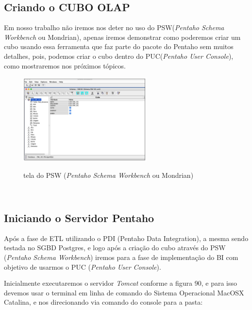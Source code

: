 \subsection{Criando o CUBO OLAP}

Em nosso trabalho n\~{a}o iremos nos deter no uso do PSW(\textit{Pentaho Schema Workbench} ou Mondrian), apenas iremos demonstrar como poderemos criar um cubo usando essa ferramenta que faz parte do pacote do Pentaho sem muitos detalhes, pois, podemos criar o cubo dentro do PUC(\textit{Pentaho User Console}), como mostraremos nos pr\'oximos t\'opicos.

\begin{figure}[H]
	\vspace*{0,2cm}
    \centering
    \caption{tela do PSW (\textit{Pentaho Schema Workbench} ou Mondrian)}
    \includegraphics[width=0.6\textwidth]{./04-figuras/figura-pentaho-psw}
    \label{fig:ilustfigpentaho-psw}
\end{figure}
\vspace*{-0,9cm}
{\raggedright {}} \\

\subsection{Iniciando o Servidor Pentaho}

Ap\'os a fase de ETL utilizando o PDI (Pentaho Data Integration), a mesma sendo testada no SGBD Postgres, e logo ap\'os a cria\c{c}\~{a}o do cubo atrav\'{e}s do PSW (\textit{Pentaho Schema Workbench}) iremos para a fase de implementa\c{c}\~{a}o do BI com objetivo de usarmos o PUC (\textit{Pentaho User Console}).

Inicialmente executaremos o servidor \textit{Tomcat} conforme a figura 90, e para isso devemos usar o terminal em linha de comando do Sistema Operacional MacOSX Catalina, e nos direcionando via comando do console para a pasta:

